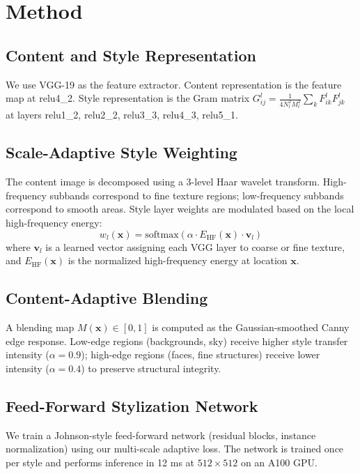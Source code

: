 \documentclass[conference]{IEEEtran}
\begin{document}
\section{Method}

\subsection{Content and Style Representation}
We use VGG-19 \cite{simonyan2014very} as the feature extractor. Content representation is the feature map at relu4\_2. Style representation is the Gram matrix $G^l_{ij} = \frac{1}{4N_l^2 M_l^2} \sum_k F^l_{ik} F^l_{jk}$ at layers relu1\_2, relu2\_2, relu3\_3, relu4\_3, relu5\_1.

\subsection{Scale-Adaptive Style Weighting}
The content image is decomposed using a 3-level Haar wavelet transform. High-frequency subbands correspond to fine texture regions; low-frequency subbands correspond to smooth areas. Style layer weights are modulated based on the local high-frequency energy:
\begin{equation}
w_l(\mathbf{x}) = \text{softmax}\left(\alpha \cdot E_{\text{HF}}(\mathbf{x}) \cdot \mathbf{v}_l\right)
\end{equation}
where $\mathbf{v}_l$ is a learned vector assigning each VGG layer to coarse or fine texture, and $E_{\text{HF}}(\mathbf{x})$ is the normalized high-frequency energy at location $\mathbf{x}$.

\subsection{Content-Adaptive Blending}
A blending map $M(\mathbf{x}) \in [0, 1]$ is computed as the Gaussian-smoothed Canny edge response. Low-edge regions (backgrounds, sky) receive higher style transfer intensity ($\alpha = 0.9$); high-edge regions (faces, fine structures) receive lower intensity ($\alpha = 0.4$) to preserve structural integrity.

\subsection{Feed-Forward Stylization Network}
We train a Johnson-style feed-forward network \cite{johnson2016perceptual} (residual blocks, instance normalization) using our multi-scale adaptive loss. The network is trained once per style and performs inference in 12 ms at $512 \times 512$ on an A100 GPU.
\end{document}
